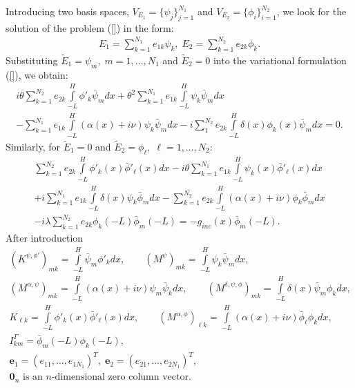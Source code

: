 \documentclass[proc]{edpsmath}
\begin{document}
Introducing two basis spaces, $V_{E_{1}}=\{\psi_{j}\}_{j=1}^{N_{1}}$ and $V_{E_{2}}=\{\phi_{i}\}_{i=1}^{N_{2}}$, we look for the solution of the problem (\ref{}) in the form:
\begin{align*}
E_{1}=\sum\limits_{k=1}^{N_{1}}e_{1k}\psi_{k},\; E_{2}=\sum\limits_{k=1}^{N_{2}}e_{2k}\phi_{k}.
\end{align*}
Substituting $\tilde{E}_{1}=\psi_{m}, \; m=1,\ldots,N_{1}$ and $\tilde{E}_{2}=0$ into the variational formulation (\ref{}), we obtain:
\begin{align*}
i\theta\sum\limits_{k=1}^{N_{2}}e_{2k}\int\limits_{-L}^{H}\phi'_{k}\bar{\psi}_{m}dx+\theta^2\sum\limits_{k=1}^{N_{1}}e_{1k}\int\limits_{-L}^{H}\psi_{k}\bar{\psi}_{m}dx\\
-\sum\limits_{k=1}^{N_{1}}e_{1k}\int\limits_{-L}^{H}(\alpha(x)+i\nu)\psi_{k}\bar{\psi}_{m}dx-i\sum\limits_{1}^{N_{2}}e_{2k}\int\limits_{-L}^{H}\delta(x)\phi_{k}(x)\bar{\psi}_{m}dx=0.
\end{align*}
Similarly, for $\tilde{E}_{1}=0$ and $\tilde{E}_{2}=\phi_{\ell},\; \ell=1,\ldots, N_{2}$:
\begin{align*}
\sum\limits_{k=1}^{N_{2}}e_{2k}\int\limits_{-L}^{H}\phi'_{k}(x)\bar{\phi}'_{\ell}(x)dx-i\theta\sum\limits_{k=1}^{N_{1}}e_{1k}\int\limits_{-L}^{H}\psi_{k}(x)\bar{\phi}'_{\ell}(x)dx\\
+i
\sum\limits_{k=1}^{N_{1}}e_{1k}\int\limits_{-L}^{H}\delta(x)\psi_{k}\bar{\phi}_{m}dx-\sum\limits_{k=1}^{N_{2}}e_{2k}\int\limits_{-L}^{H}(\alpha(x)+i\nu)\phi_{k}\bar{\phi}_{m}dx\\
-
i\lambda\sum\limits_{k=1}^{N_{2}}e_{2k}\phi_{k}(-L)\bar{\phi}_{m}(-L)=-g_{inc}(x)\bar{\phi}_{m}(-L).
\end{align*}
After introduction 
\begin{align*}
\left(K^{\psi,\phi'}\right)_{mk}=\int\limits_{-L}^{H}\bar{\psi}_{m}\phi'_{k}dx,\qquad \left(M^{\psi}\right)_{mk}=\int\limits_{-L}^{H}\psi_{k}\bar{\psi}_{m}dx,\\
\left(M^{\alpha,\psi}\right)_{mk}=\int\limits_{-L}^{H}(\alpha(x)+i\nu)\psi_{m}\bar{\psi}_{k}dx, \qquad \left(M^{\delta,\psi,\phi}\right)_{mk}=\int\limits_{-L}^{H}\delta(x)\bar{\psi}_{m}\phi_{k}dx,\\
K_{\ell k}=\int\limits_{-L}^{H}\phi'_{k}(x)\bar{\phi}'_{\ell}(x)dx,\qquad \left(M^{\alpha,\phi}\right)_{\ell k}=\int\limits_{-L}^{H}(\alpha(x)+i\nu)\bar{\phi}_{\ell}\phi_{k}dx,\\
I_{km}^{\Gamma}=\bar{\phi}_{m}(-L)\phi_{k}(-L),\\
\boldsymbol{e}_{1}=\left(e_{11},\ldots,e_{1 N_{1}}\right)^{T},\; \boldsymbol{e}_{2}=\left(e_{21},\ldots,e_{2 N_{1}}\right)^{T},\\
\boldsymbol{0}_{n} \text{ is an $n$-dimensional zero column vector}.
\end{align*}
\end{document}
